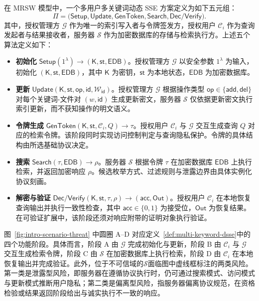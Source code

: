 \begin{definition}\label{def:multi-keyword-dsse}
在 MRSW 模型中，一个多用户多关键词动态 SSE 方案定义为如下五元组：
\begin{equation}
\Pi=\big(\mathsf{Setup},\mathsf{Update},\mathsf{GenToken},\mathsf{Search},\mathsf{Dec/Verify}\big).
\end{equation}
其中，授权管理方 $\mathcal{G}$ 作为唯一的索引写入者与令牌签发方，授权用户 $\mathcal{C}_i$ 作为查询发起者与结果接收者，服务器 $\mathcal{S}$ 作为加密数据库的存储与检索执行方。上述五个算法定义如下\cite{10.1145/1180405.1180417,10.1145/2636328,10.1145/3634737.3657018}：
\begin{itemize}
  \item \textbf{初始化} $\mathsf{Setup}(1^\lambda)\to(\mathsf{K},\mathsf{st},\mathsf{EDB})$。授权管理方 $\mathcal{G}$ 以安全参数 $1^\lambda$ 为输入，初始化 $(\mathsf{K},\mathsf{st},\mathsf{EDB})$，其中 $\mathsf{K}$ 为密钥，$\mathsf{st}$ 为本地状态，$\mathsf{EDB}$ 为加密数据库。
  \item \textbf{更新} $\mathsf{Update}(\mathsf{K},\mathsf{st},\mathsf{op},\mathsf{id},\mathcal{W}_{\mathsf{id}})$。授权管理方 $\mathcal{G}$ 根据操作类型 $\mathsf{op}\in\{\mathsf{add},\mathsf{del}\}$ 对每个关键词-文件对 $(w,\mathsf{id})$ 生成更新密文，服务器 $\mathcal{S}$ 仅依据更新密文执行索引更新，而不获知操作的明文语义。
  \item \textbf{令牌生成} $\mathsf{GenToken}(\mathsf{K},\mathsf{st},\mathcal{C}_i,Q)\to\tau$。授权用户 $\mathcal{C}_i$ 与 $\mathcal{G}$ 交互生成查询 $Q$ 对应的检索令牌。该阶段同时实现访问控制判定与查询隐私保护。令牌的具体结构由所选基础协议决定。
  \item \textbf{搜索} $\mathsf{Search}(\tau,\mathsf{EDB})\to\rho$。服务器 $\mathcal{S}$ 根据令牌 $\tau$ 在加密数据库 $\mathsf{EDB}$ 上执行检索，并返回加密响应 $\rho$。候选枚举方式、过滤规则与泄露边界由具体实例化协议刻画。
  \item \textbf{解密与验证} $\mathsf{Dec/Verify}(\mathsf{K},\mathsf{st},\tau,\rho)\to(\mathsf{acc},\mathsf{Out})$。授权用户 $\mathcal{C}_i$ 在本地恢复查询输出并执行一致性检查，其中 $\mathsf{acc}\in\{0,1\}$ 为接受位，$\mathsf{Out}$ 为恢复结果。在可验证扩展中，该阶段还须对响应附带的证明对象执行验证。
\end{itemize}
\end{definition}

图~\ref{fig:intro-scenario-threat} 中圆圈 A--D 对应定义~\ref{def:multi-keyword-dsse}中的四个功能阶段。具体而言，阶段 A 由 $\mathcal{G}$ 完成初始化与更新，阶段 B 由 $\mathcal{C}_i$ 与 $\mathcal{G}$ 交互生成检索令牌，阶段 C 由 $\mathcal{S}$ 在加密数据库上执行检索，阶段 D 由 $\mathcal{C}_i$ 在本地恢复输出并完成验证。此外，位于不可信域的$\mathcal{S}$面临图中虚线框标注的两类风险。第一类是泄露型风险，即服务器在遵循协议执行时，仍可通过搜索模式、访问模式与更新模式推断用户隐私；第二类是偏离型风险，指服务器偏离协议规范，在资格检验或结果返回阶段给出与诚实执行不一致的响应。

